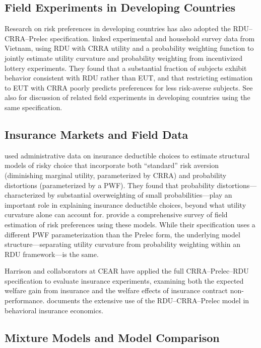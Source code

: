 \documentclass[12pt,a4paper]{article}
\begin{document}
\subsection{Field Experiments in Developing Countries}

Research on risk preferences in developing countries has also adopted the
RDU--CRRA--Prelec specification. \textcite{Tanaka2010} linked experimental and
household survey data from Vietnam, using RDU with CRRA utility and a
probability weighting function to jointly estimate utility curvature and
probability weighting from incentivized lottery experiments. They found that a
substantial fraction of subjects exhibit behavior consistent with RDU rather
than EUT, and that restricting estimation to EUT with CRRA poorly predicts
preferences for less risk-averse subjects. See also
\textcite{HarrisonRutstrom2008} for discussion of related field experiments in
developing countries using the same specification.

\subsection{Insurance Markets and Field Data}

\textcite{Barseghyan2013} used administrative data on insurance deductible
choices to estimate structural models of risky choice that incorporate both
``standard'' risk aversion (diminishing marginal utility, parameterized by
CRRA) and probability distortions (parameterized by a PWF). They found that
probability distortions---characterized by substantial overweighting of small
probabilities---play an important role in explaining insurance deductible
choices, beyond what utility curvature alone can account for.
\textcite{Barseghyan2018} provide a comprehensive survey of field estimation of
risk preferences using these models. While their specification uses a different
PWF parameterization than the Prelec form, the underlying model
structure---separating utility curvature from probability weighting within an
RDU framework---is the same.

Harrison and collaborators at CEAR have applied the full CRRA--Prelec--RDU
specification to evaluate insurance experiments, examining both the expected
welfare gain from insurance \parencite{Harrison2016} and the welfare effects of
insurance contract non-performance. \textcite{Harrison2019} documents the
extensive use of the RDU--CRRA--Prelec model in behavioral insurance economics.

\subsection{Mixture Models and Model Comparison}
\end{document}
